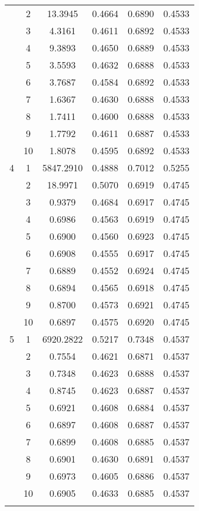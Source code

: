 \begin{longtable}{|c|c|c|c|c|c|}
  & 2 & 13.3945 & 0.4664 & 0.6890 & 0.4533 \\
  & 3 & 4.3161 & 0.4611 & 0.6892 & 0.4533 \\
  & 4 & 9.3893 & 0.4650 & 0.6889 & 0.4533 \\
  & 5 & 3.5593 & 0.4632 & 0.6888 & 0.4533 \\
  & 6 & 3.7687 & 0.4584 & 0.6892 & 0.4533 \\
  & 7 & 1.6367 & 0.4630 & 0.6888 & 0.4533 \\
  & 8 & 1.7411 & 0.4600 & 0.6888 & 0.4533 \\
  & 9 & 1.7792 & 0.4611 & 0.6887 & 0.4533 \\
  & 10 & 1.8078 & 0.4595 & 0.6892 & 0.4533 \\
\hline
4 & 1 & 5847.2910 & 0.4888 & 0.7012 & 0.5255 \\
  & 2 & 18.9971 & 0.5070 & 0.6919 & 0.4745 \\
  & 3 & 0.9379 & 0.4684 & 0.6917 & 0.4745 \\
  & 4 & 0.6986 & 0.4563 & 0.6919 & 0.4745 \\
  & 5 & 0.6900 & 0.4560 & 0.6923 & 0.4745 \\
  & 6 & 0.6908 & 0.4555 & 0.6917 & 0.4745 \\
  & 7 & 0.6889 & 0.4552 & 0.6924 & 0.4745 \\
  & 8 & 0.6894 & 0.4565 & 0.6918 & 0.4745 \\
  & 9 & 0.8700 & 0.4573 & 0.6921 & 0.4745 \\
  & 10 & 0.6897 & 0.4575 & 0.6920 & 0.4745 \\
\hline
5 & 1 & 6920.2822 & 0.5217 & 0.7348 & 0.4537 \\
  & 2 & 0.7554 & 0.4621 & 0.6871 & 0.4537 \\
  & 3 & 0.7348 & 0.4623 & 0.6888 & 0.4537 \\
  & 4 & 0.8745 & 0.4623 & 0.6887 & 0.4537 \\
  & 5 & 0.6921 & 0.4608 & 0.6884 & 0.4537 \\
  & 6 & 0.6897 & 0.4608 & 0.6887 & 0.4537 \\
  & 7 & 0.6899 & 0.4608 & 0.6885 & 0.4537 \\
  & 8 & 0.6901 & 0.4630 & 0.6891 & 0.4537 \\
  & 9 & 0.6973 & 0.4605 & 0.6886 & 0.4537 \\
  & 10 & 0.6905 & 0.4633 & 0.6885 & 0.4537 \\
\hline
\label{table:mlp1hyp}
\end{longtable}


